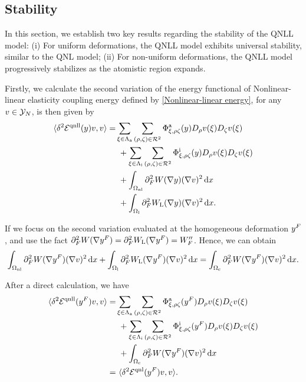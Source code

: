 \subsection{Stability}
\label{sec: stability_qnll_ncg}

In this section, we establish two key results regarding the stability of the QNLL model: (i) For uniform deformations, the QNLL model exhibits universal stability, similar to the QNL model; (ii) For non-uniform deformations, the QNLL model progressively stabilizes as the atomistic region expands.

Firstly, we calculate the second variation of the energy functional of Nonlinear-linear elasticity coupling energy defined by \eqref{Nonlinear-linear energy}, for any $v\in\mathcal{Y}_N$, is then given by
\begin{equation}\label{Stab of NL-L}
	\begin{split}
		\langle \delta^{2} \mathcal{E}^{{\rm qnll}} (y)v,v\rangle =& \sum_{\xi \in \Lambda_{\rm a}} \sum_{(\rho,\zeta)\in\mathcal{R}^{2}}  \Phi^{{\rm a}}_{\xi,\rho\zeta}(y)D_{\rho}v(\xi)D_{\zeta}v(\xi)\\
		&\ +\sum_{\xi \in \Lambda_{\rm i}} \sum_{(\rho,\zeta)\in\mathcal{R}^{2}} \Phi^{{\rm i}}_{\xi,\rho\zeta}(y)D_{\rho}v(\xi)D_{\zeta}v(\xi)\\
		&\ +\int_{\Omega_{{\rm nl}}}\partial_{F}^{2}W(\nabla y) (\nabla v)^{2}\,\text{d} x\\
		&\ +\int_{\Omega_{{\rm l}}}\partial_{F}^{2}W_{{\rm L}}(\nabla y) (\nabla v)^{2}\,\text{d} x.
	\end{split}
\end{equation}

If we focus on the second variation evaluated at the homogeneous deformation $y^{F}$, and use the fact $\partial_{F}^{2}W(\nabla y^{F})=\partial_{F}^{2}W_{{\rm L}}(\nabla y^{F})=W^{\prime \prime}_F$. Hence, we can obtain
\begin{equation*}
	\int_{\Omega_{{\rm nl}}}\partial_{F}^{2}W(\nabla y^{F}) (\nabla v)^{2}\,\text{d} x +\int_{\Omega_{{\rm l}}}\partial_{F}^{2}W_{{\rm L}}(\nabla y^{F})  (\nabla v)^{2}\,\text{d} x =\int_{\Omega_{{\rm c}}}\partial_{F}^{2}W(\nabla y^{F}) (\nabla v)^{2}\,\text{d} x.
\end{equation*}

After a direct calculation, we have
\begin{equation}\label{Stab of QNLL equals to QNL}
	\begin{split}
		\langle \delta^{2} \mathcal{E}^{{\rm qnll}} (y^{F})v,v\rangle 
		=&\sum_{\xi \in \Lambda_{\rm a}} \sum_{(\rho,\zeta)\in\mathcal{R}^{2}}  \Phi^{{\rm a}}_{\xi,\rho\zeta}(y^{F})D_{\rho}v(\xi)D_{\zeta}v(\xi)\\
		&\ +\sum_{\xi \in \Lambda_{\rm i}} \sum_{(\rho,\zeta)\in\mathcal{R}^{2}} \Phi^{{\rm i}}_{\xi,\rho\zeta}(y^{F})D_{\rho}v(\xi)D_{\zeta}v(\xi)\\
		&\ +\int_{\Omega_{{\rm c}}}\partial_{F}^{2}W(\nabla y^{F}) (\nabla v)^{2}\,\text{d} x \\
		=&~\langle \delta^{2} \mathcal{E}^{{\rm qnl}} (y^{F})v,v\rangle. 
	\end{split}
\end{equation}

